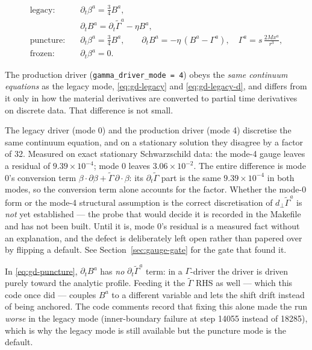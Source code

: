 \documentclass[11pt,openany]{book}
\begin{document}
\begin{align}
\text{legacy:} \quad
&\partial_t\beta^a = \tfrac34 B^a, \label{eq:gd-legacy}\\
&\partial_t B^a = \partial_t\tilde{\Gamma}^a - \eta B^a,
  \label{eq:gd-legacy-d}\\
\text{puncture:} \quad
&\partial_t\beta^a = \tfrac34 B^a,\qquad
  \partial_t B^a = -\eta\,(B^a - \Gamma^a), \quad
  \Gamma^a = s\,\frac{2Mx^a}{r^3}, \label{eq:gd-puncture}\\
\text{frozen:} \quad &\partial_t\beta^a = 0.
  \label{eq:gd-frozen}
\end{align}

The production driver (\texttt{gamma\_driver\_mode = 4}) obeys the \emph{same
continuum equations} as the legacy mode, \eqref{eq:gd-legacy} and
\eqref{eq:gd-legacy-d}, and differs from it only in how the material
derivatives are converted to partial time derivatives on discrete data. That
difference is not small.

\gotcha
The legacy driver (mode 0) and the production driver (mode 4) discretise the
same continuum equation, and on a stationary solution they disagree by a
factor of 32. Measured on exact stationary Schwarzschild data: the mode-4
gauge leaves a residual of $9.39\times10^{-4}$; mode 0 leaves
$3.06\times10^{-2}$. The entire difference is mode 0's conversion term
$\beta\!\cdot\!\partial\beta + \tilde\Gamma\,\partial\!\cdot\!\beta$: its
$\partial_t\tilde{\Gamma}$ part is the same $9.39\times10^{-4}$ in both
modes, so the conversion term alone accounts for the factor. Whether the
mode-0 form or the mode-4 structural assumption is the correct discretisation
of $d_\perp\tilde{\Gamma}^a$ is \emph{not} yet established --- the probe that
would decide it is recorded in the Makefile and has not been built. Until it
is, mode 0's residual is a measured fact without an explanation, and the
defect is deliberately left open rather than papered over by flipping a
default. See Section~\ref{sec:gauge-gate} for the gate that found it.

\gotcha
In \eqref{eq:gd-puncture}, $\partial_t B^a$ has \emph{no} $\partial_t
\tilde{\Gamma}^a$ term: in a $\Gamma$-driver the driver is driven purely toward
the analytic profile. Feeding it the $\tilde{\Gamma}$ RHS as well --- which this
code once did --- couples $B^a$ to a different variable and lets the shift
drift instead of being anchored. The code comments record that fixing this
alone made the run \emph{worse} in the legacy mode (inner-boundary failure at
step 14055 instead of 18285), which is why the legacy mode is still available
but the puncture mode is the default.
\end{document}
